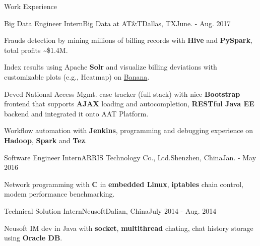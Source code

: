 \documentclass{resume} %
\begin{document}
\begin{rSection}{Work Experience}
\begin{rSubsection}{Big Data Engineer Intern}{Big Data at AT\&T}{Dallas, TX}{June. - Aug. 2017}
\item Frauds detection by mining millions of billing records with \textbf{Hive} and \textbf{PySpark}, total profits \textasciitilde \$1.4M.
\item Index results using Apache \textbf{Solr} and visualize billing deviations with customizable plots (e.g., Heatmap) on \href{https://github.com/lucidworks/banana}{Banana}.
\item Deved National Access Mgmt. case tracker (full stack) with nice \textbf{Bootstrap} frontend that supports \textbf{AJAX} loading and autocompletion, \textbf{RESTful Java EE} backend and integrated it onto AAT Platform.
\item Workflow automation with \textbf{Jenkins}, programming and debugging experience on \textbf{Hadoop}, \textbf{Spark} and \textbf{Tez}.
\end{rSubsection}

\begin{rSubsection}{Software Engineer Intern}{ARRIS Technology Co., Ltd.}{Shenzhen, China}{Jan. - May 2016}
\item Network programming with \textbf{C} in \textbf{embedded Linux}, \textbf{iptables} chain control, modem performance benchmarking.
\end{rSubsection}

\begin{rSubsection}{Technical Solution Intern}{Neusoft}{Dalian, China}{July 2014 - Aug. 2014}
\item Neusoft IM dev in Java with \textbf{socket}, \textbf{multithread} chating, chat history storage using \textbf{Oracle DB}.
\end{rSubsection}
\end{rSection}
\end{document}
